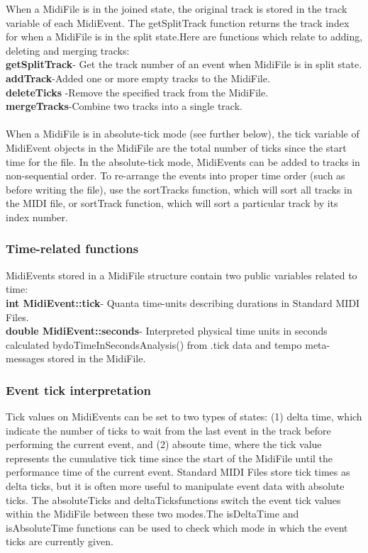 \documentclass[12pt,a4paper]{article}
\begin{document}
When a MidiFile is in the joined state, the original track is stored in the track variable of each MidiEvent. The getSplitTrack function returns the track index for when a MidiFile is in the split state.Here are functions which relate to adding, deleting and merging tracks:\\

  \textbf{getSplitTrack}- Get the track number of an event when MidiFile is in split state.\\
	 \textbf{addTrack}-Added one or more empty tracks to the MidiFile.\\
  \textbf{deleteTicks }-Remove the specified track from the MidiFile.\\
  \textbf{mergeTracks}-Combine two tracks into a single track.\\ \\

When a MidiFile is in absolute-tick mode (see further below), the tick variable of MidiEvent objects in the MidiFile are the total number of ticks since the start time for the file. In the absolute-tick mode, MidiEvents can be added to tracks in non-sequential order. To re-arrange the events into proper time order (such as before writing the file), use the sortTracks function, which will sort all tracks in the MIDI file, or sortTrack function, which will sort a particular track by its index number.


\subsubsection{Time-related functions}

MidiEvents stored in a MidiFile structure contain two public variables related to time:\\

 \textbf{int MidiEvent::tick}- Quanta time-units describing durations in Standard MIDI Files.\\
 \textbf{double MidiEvent::seconds}- Interpreted physical time units in seconds calculated bydoTimeInSecondsAnalysis() from .tick data and tempo meta-messages stored in the MidiFile.\\

\subsubsection{Event tick interpretation}

Tick values on MidiEvents can be set to two types of states: (1) delta time, which indicate the number of ticks to wait from the last event in the track before performing the current event, and (2) absoute time, where the tick value represents the cumulative tick time since the start of the MidiFile until the performance time of the current event. Standard MIDI Files store tick times as delta ticks, but it is often more useful to manipulate event data with absolute ticks. The absoluteTicks and deltaTicksfunctions switch the event tick values within the MidiFile between these two modes.The isDeltaTime and isAbsoluteTime functions can be used to check which mode in which the event ticks are currently given.\\
\end{document}
